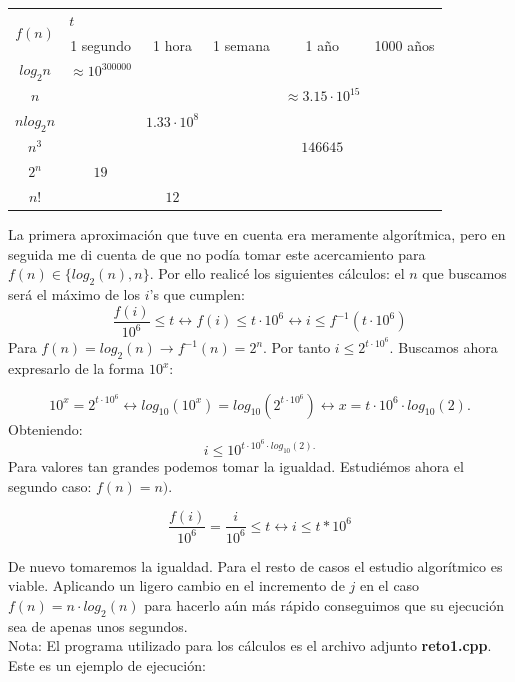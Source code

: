 \documentclass[11pt,a4paper]{article}
\begin{document}
\begin{enumerate}
\newpage

\begin{table}[!htbp]
\centering
\label{Tabla}
\begin{tabular}{|c|c|c|c|c|c|}
\hline
 \multirow{2}{*}{$f(n)$}& \multicolumn{5}{l|}{\hfil$t$} \\ \cline{2-6} 
 &  1 segundo  & 1 hora   & 1 semana   &  1 año  & 1000 años  \\ \hline
 $log_2n$ &  $\approx 10^{300000}$  &    &    &    &   \\ \hline
 $n$&   &    &    &  $\approx 3.15 \cdot 10^{15}$  &  \\ \hline
 $nlog_2n$&    &  $1.33 \cdot 10^8$  & &    &   \\ \hline
 $n^3$&    &    &   &  $146645$  &   \\ \hline
 $2^n$&  $19$  &  &    &  & \\ \hline
 $n!$&    &  $12$  &   &    &  \\ \hline
\end{tabular}
\end{table}

La primera aproximación que tuve en cuenta era meramente algorítmica, pero en seguida me di cuenta de que no podía tomar este acercamiento para $f(n) \in \{log_2(n), n\}$. Por ello realicé los siguientes cálculos: el $n$ que buscamos será el máximo de los $i$'s que cumplen: 
$$\frac{f(i)}{10^6} \leq t \leftrightarrow f(i) \leq t \cdot 10^6 \leftrightarrow i \leq f^{-1}(t \cdot 10^6)$$
Para $f(n) = log_2(n) \rightarrow f^{-1}(n) = 2^n$. Por tanto $i \leq 2^{t \cdot 10^6}$. Buscamos ahora expresarlo de la forma $10^x$:

$$10^x = 2^{t \cdot 10^6} \leftrightarrow log_{10}(10^x) = log_{10}(2^{t \cdot 10^6}) \leftrightarrow x = t \cdot 10^6 \cdot log_{10} (2). $$ 
Obteniendo: $$i \leq 10^{t \cdot 10^6 \cdot log_{10} (2). }$$
Para valores tan grandes podemos tomar la igualdad. Estudiémos ahora el segundo caso: $f(n) = n)$.

$$\frac{f(i)}{10^6} = \frac{i}{10^6} \leq t \leftrightarrow i \leq t * 10^6$$

De nuevo tomaremos la igualdad. Para el resto de casos el estudio algorítmico es viable. Aplicando un ligero cambio en el incremento de $j$ en el caso $f(n) = n \cdot log_2(n)$ para hacerlo aún más rápido conseguimos que su ejecución sea de apenas unos segundos. \\

Nota: El programa utilizado para los cálculos es el archivo adjunto \textbf{reto1.cpp}. Este es un ejemplo de ejecución:


\end{enumerate}
\end{document}
